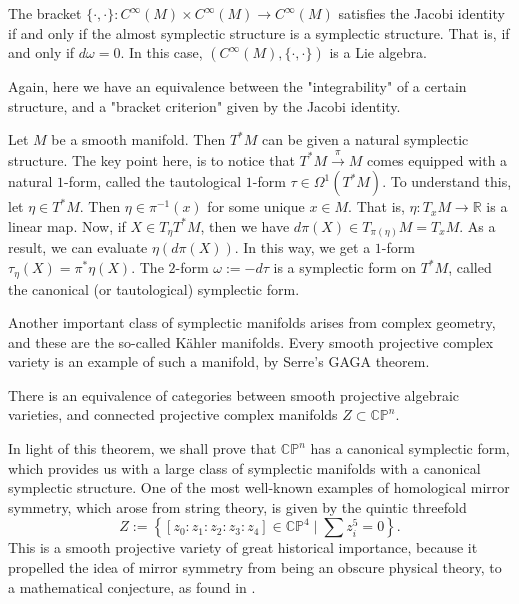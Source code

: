 \begin{theorem}
  The bracket $\{\cdot,\cdot\}:C^\infty(M)\times C^\infty(M)\to C^\infty(M)$ satisfies the Jacobi identity if and only if the almost symplectic structure is a symplectic structure. That is, if and only if $d\omega=0$. In this case, $(C^\infty(M),\{\cdot,\cdot\})$ is a Lie algebra.
\end{theorem}
Again, here we have an equivalence between the "integrability" of a certain structure, and a "bracket criterion" given by the Jacobi identity.
\begin{example}
  Let $M$ be a smooth manifold. Then $T^*M$ can be given a natural symplectic structure. The key point here, is to notice that $T^*M\xrightarrow{\pi}M$ comes equipped with a natural $1$-form, called the tautological $1$-form $\tau\in\Omega^1(T^*M)$. To understand this, let $\eta\in T^*M$. Then $\eta\in \pi^{-1}(x)$ for some unique $x\in M$. That is, $\eta:T_xM\to \mathbb{R}$ is a linear map. Now, if $X\in T_\eta T^*M$, then we have $d\pi(X)\in T_{\pi(\eta)}M=T_xM$. As a result, we can evaluate $\eta(d\pi(X))$. In this way, we get a $1$-form $\tau_\eta(X)=\pi^*\eta(X)$. The $2$-form $\omega:=-d\tau$ is a symplectic form on $T^*M$, called the canonical (or tautological) symplectic form.
\end{example}
Another important class of symplectic manifolds arises from complex geometry, and these are the so-called Kähler manifolds. Every smooth projective complex variety is an example of such a manifold, by Serre's GAGA theorem.
\begin{theorem}
  There is an equivalence of categories between smooth projective algebraic varieties, and connected projective complex manifolds $Z\subset\mathbb{CP}^n$.
\end{theorem}
In light of this theorem, we shall prove that $\mathbb{CP}^n$ has a canonical symplectic form, which provides us with a large class of symplectic manifolds with a canonical symplectic structure. One of the most well-known examples of homological mirror symmetry, which arose from string theory, is given by the quintic threefold
\begin{equation}
Z:=\left\{[z_0:z_1:z_2:z_3:z_4]\in\mathbb{CP}^4\mid \sum z_i^5=0\right\}.
\end{equation}
This is a smooth projective variety of great historical importance, because it propelled the idea of mirror symmetry from being an obscure physical theory, to a mathematical conjecture, as found in \cite{Kontsevich1994Homological}.
